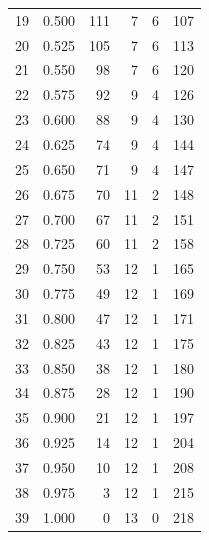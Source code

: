 \documentclass[a4paper,twoside,12pt]{book}
\begin{document}
\begin{appendices}
\begin{table}
\begin{tabular}{lrrrrr}
		19 &  0.500 &       111 &         7 &               6 &             107 \\
		20 &  0.525 &       105 &         7 &               6 &             113 \\
		21 &  0.550 &        98 &         7 &               6 &             120 \\
		22 &  0.575 &        92 &         9 &               4 &             126 \\
		23 &  0.600 &        88 &         9 &               4 &             130 \\
		24 &  0.625 &        74 &         9 &               4 &             144 \\
		25 &  0.650 &        71 &         9 &               4 &             147 \\
		26 &  0.675 &        70 &        11 &               2 &             148 \\
		27 &  0.700 &        67 &        11 &               2 &             151 \\
		28 &  0.725 &        60 &        11 &               2 &             158 \\
		29 &  0.750 &        53 &        12 &               1 &             165 \\
		30 &  0.775 &        49 &        12 &               1 &             169 \\
		31 &  0.800 &        47 &        12 &               1 &             171 \\
		32 &  0.825 &        43 &        12 &               1 &             175 \\
		33 &  0.850 &        38 &        12 &               1 &             180 \\
		34 &  0.875 &        28 &        12 &               1 &             190 \\
		35 &  0.900 &        21 &        12 &               1 &             197 \\
		36 &  0.925 &        14 &        12 &               1 &             204 \\
		37 &  0.950 &        10 &        12 &               1 &             208 \\
		38 &  0.975 &         3 &        12 &               1 &             215 \\
		39 &  1.000 &         0 &        13 &               0 &             218 \\
		\bottomrule
	\end{tabular}
\end{table}


\end{appendices}
\end{document}
